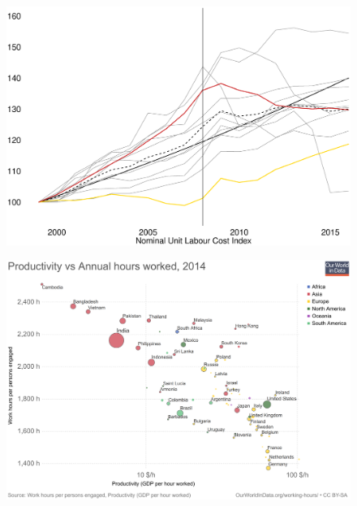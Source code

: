 \documentclass{beamer}
\begin{document}
\begin{frame}
  \begin{figure}
    \includegraphics[scale=.3]{unit_labour_cost.eps}
  \end{figure}
\end{frame}

\begin{frame}
  \begin{figure}
    \includegraphics[scale=.09]{hours_worked.eps}
  \end{figure}
\end{frame}
\end{document}

